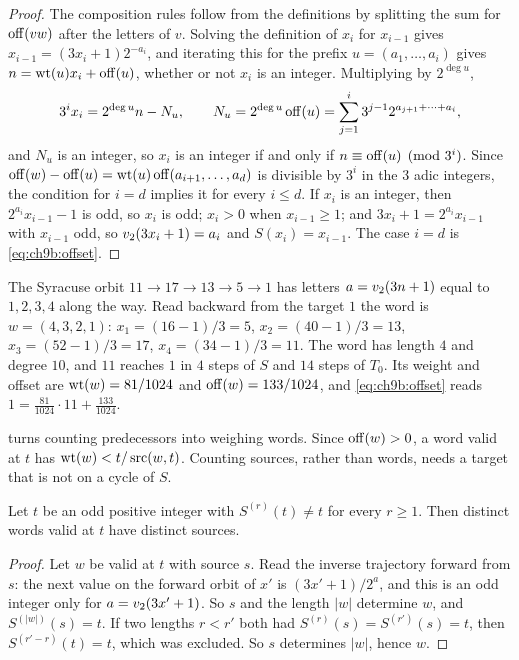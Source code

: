 \begin{proof}
The composition rules follow from the definitions by splitting the sum for $\operatorname{off}(vw)$ after the letters of $v$. Solving the definition of $x_i$ for $x_{i-1}$ gives $x_{i-1}=(3x_i+1)2^{-a_i}$, and iterating this for the prefix $u=(a_1,\ldots,a_i)$ gives $n=\operatorname{wt}(u)x_i+\operatorname{off}(u)$, whether or not $x_i$ is an integer. Multiplying by $2^{\deg u}$,
\[
  3^ix_i=2^{\deg u}n-N_u,\qquad N_u=2^{\deg u}\operatorname{off}(u)=\sum_{j=1}^{i}3^{j-1}2^{a_{j+1}+\cdots+a_i},
\]
and $N_u$ is an integer, so $x_i$ is an integer if and only if $n\equiv\operatorname{off}(u)\pmod{3^i}$. Since $\operatorname{off}(w)-\operatorname{off}(u)=\operatorname{wt}(u)\operatorname{off}(a_{i+1},\ldots,a_d)$ is divisible by $3^i$ in the $3$ adic integers, the condition for $i=d$ implies it for every $i\le d$. If $x_i$ is an integer, then $2^{a_i}x_{i-1}-1$ is odd, so $x_i$ is odd; $x_i>0$ when $x_{i-1}\ge1$; and $3x_i+1=2^{a_i}x_{i-1}$ with $x_{i-1}$ odd, so $v_2(3x_i+1)=a_i$ and $S(x_i)=x_{i-1}$. The case $i=d$ is \eqref{eq:ch9b:offset}.
\end{proof}

\begin{example}\label{ex:ch9b:eleven}
The Syracuse orbit $11\to17\to13\to5\to1$ has letters $a=v_2(3n+1)$ equal to $1,2,3,4$ along the way. Read backward from the target $1$ the word is $w=(4,3,2,1)$: $x_1=(16-1)/3=5$, $x_2=(40-1)/3=13$, $x_3=(52-1)/3=17$, $x_4=(34-1)/3=11$. The word has length $4$ and degree $10$, and $11$ reaches $1$ in $4$ steps of $S$ and $14$ steps of $T_0$. Its weight and offset are $\operatorname{wt}(w)=81/1024$ and $\operatorname{off}(w)=133/1024$, and \eqref{eq:ch9b:offset} reads $1=\frac{81}{1024}\cdot11+\frac{133}{1024}$.
\end{example}

 turns counting predecessors into weighing words. Since $\operatorname{off}(w)>0$, a word valid at $t$ has $\operatorname{wt}(w)<t/\operatorname{src}(w,t)$. Counting sources, rather than words, needs a target that is not on a cycle of $S$.

\begin{lemma}\label{lem:ch9b:distinct}
Let $t$ be an odd positive integer with $S^{(r)}(t)\ne t$ for every $r\ge1$. Then distinct words valid at $t$ have distinct sources.
\end{lemma}

\begin{proof}
Let $w$ be valid at $t$ with source $s$. Read the inverse trajectory forward from $s$: the next value on the forward orbit of $x'$ is $(3x'+1)/2^{a}$, and this is an odd integer only for $a=v_2(3x'+1)$. So $s$ and the length $|w|$ determine $w$, and $S^{(|w|)}(s)=t$. If two lengths $r<r'$ both had $S^{(r)}(s)=S^{(r')}(s)=t$, then $S^{(r'-r)}(t)=t$, which was excluded. So $s$ determines $|w|$, hence $w$.
\end{proof}

